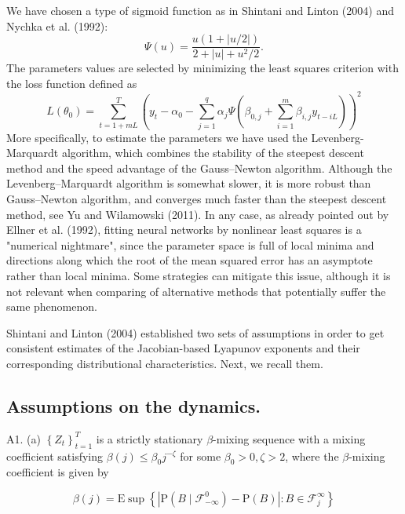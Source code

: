 \documentclass[12pt]{article}
\begin{document}
We have chosen a type of sigmoid function as in Shintani and Linton (2004) and Nychka et al. (1992):
\begin{equation}
\Psi (u)=\frac{u\left(1+|u/2|\right)}{2+|u|+u^{2}/2}. 
\end{equation}
 The parameters values are selected by minimizing the least squares criterion with the loss function defined as
\begin{equation}
L(\theta_0)=\sum_{t=1+m L}^T\left(y_t-\alpha_0-\sum_{j=1}^q\alpha_j \Psi \left(\beta_{0,j}+\sum_{i=1}^m\beta_{i,j}y_{t-iL}\right)\right)^2
\end{equation}
More specifically, to estimate the parameters we have used the Levenberg-Marquardt algorithm,
which combines the stability of the steepest descent method and the speed advantage of the Gauss–Newton
algorithm. 
Although the Levenberg–Marquardt algorithm is somewhat slower, it is more robust than Gauss–Newton algorithm, and converges much faster than the steepest descent method, see Yu and Wilamowski (2011). In any case, as already pointed out by Ellner et al. (1992), fitting neural networks by nonlinear least squares is a "numerical nightmare", since the parameter space is full of local minima and directions along which the root of the mean squared error has an asymptote rather than local minima. 
Some strategies can mitigate this issue, although it is not relevant when comparing of alternative methods that potentially suffer the same phenomenon. 



Shintani and Linton (2004) established two sets of assumptions in order to get consistent estimates of the Jacobian-based Lyapunov exponents and their corresponding distributional characteristics. Next, we recall them.





\subsection*{Assumptions on the dynamics.}





\hspace{\parindent} A1. (a) $\left\{Z_{t}\right\}_{t=1}^{T}$ is a strictly stationary $\beta$-mixing sequence with a mixing coefficient satisfying $\beta(j) \leqslant \beta_{0} j^{-\zeta}$ for some $\beta_{0}>0, \zeta>2$, where the $\beta$-mixing coefficient is given by

$$
\beta(j)=\mathrm{E} \sup \left\{\left|\mathrm{P}\left(B \mid \mathscr{F}_{-\infty}^{0}\right)-\mathrm{P}(B)\right|: B \in \mathscr{F}_{j}^{\infty}\right\}
$$
\end{document}
